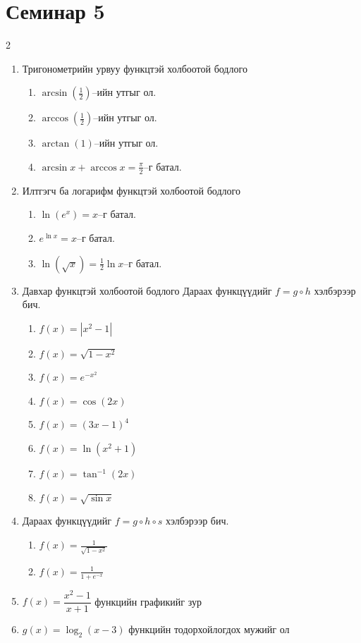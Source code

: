 \section{Семинар 5}
\begin{multicols}{2}
\begin{enumerate}
\item Тригонометрийн урвуу функцтэй холбоотой бодлого
\begin{enumerate}
\item $\arcsin(\frac{1}{2})$–ийн утгыг ол.
\item $\arccos(\frac{1}{2})$–ийн утгыг ол.
\item $\arctan(1)$–ийн утгыг ол.
\item $\arcsin x + \arccos x = \frac{\pi}{2}$–г батал.
\end{enumerate}
\item  Илтгэгч ба логарифм функцтэй холбоотой бодлого
\begin{enumerate}
\item $\ln(e^x) = x$–г батал.
\item $e^{\ln x} = x$–г батал.
\item $\ln(\sqrt{x}) = \frac{1}{2}\ln x$–г батал.
\end{enumerate}
\item Давхар функцтэй холбоотой бодлого
Дараах функцүүдийг $f = g \circ h$ хэлбэрээр бич.
\begin{enumerate}
\item $f(x) = |x^2 - 1|$ 
\item $f(x) = \sqrt{1 - x^2}$ 
\item $f(x) = e^{-x^2}$
\item $f(x) = \cos(2x)$ 
\item $f(x) = (3x - 1)^4$
\item $f(x) = \ln(x^2 + 1)$ 
\item $f(x) = \tan^{-1}(2x)$ 
\item $f(x) = \sqrt{\sin x}$
\end{enumerate}
\item Дараах функцүүдийг $f = g \circ h\circ s$ хэлбэрээр бич.
\begin{enumerate}
\item $f(x) = \frac{1}{\sqrt{1 - x^2}}$
\item $f(x) = \frac{1}{1 + e^{-x}}$ 
\end{enumerate}
\item $f(x) = \dfrac{x^2 - 1}{x + 1}$ функцийн графикийг зур
\item $g(x) = \log_2(x - 3)$ функцийн тодорхойлогдох мужийг ол

\end{enumerate}
\end{multicols}
